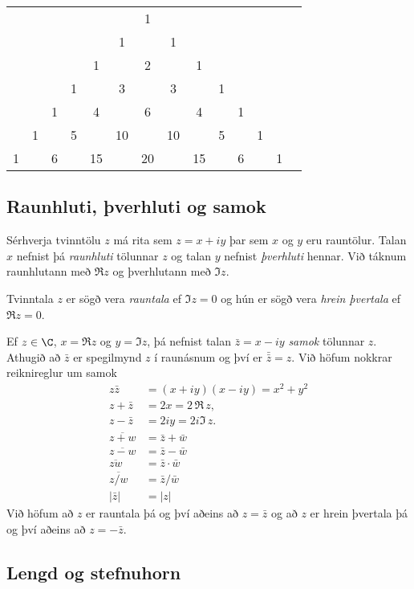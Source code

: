 \begin{center}
\begin{tabular}{cccccccccccccc}
& & & & & & 1 & & & & & & & \\
& & & & & 1 & & 1 \\
& & & & 1 & & 2 & & 1 \\
& & & 1 & & 3 & & 3 & & 1 \\
& & 1 & & 4 & & 6 & & 4 & & 1 \\
& 1 & & 5 & & 10 & & 10 & & 5 & & 1\\
1 & & 6 & & 15 & & 20 & & 15 & & 6 & & 1
\end{tabular}
\end{center}




\subsection*{Raunhluti, þverhluti og samok}

Sérhverja tvinntölu $z$ má rita sem $z=x+iy$ þar sem $x$ og
$y$ eru rauntölur. Talan $x$ nefnist þá {\it raunhluti} tölunnar 
$z$ og talan $y$ nefnist {\it þverhluti } hennar.       Við táknum
raunhlutann með $\Re z$ og þverhlutann með $\Im z$.

Tvinntala $z$ er sögð vera {\it rauntala} 
ef $\Im z=0$ og hún er sögð vera {\it hrein
þvertala} ef $\Re z=0$.  

Ef $z\in \C$, $x=\Re z$ og $y=\Im z$, þá nefnist talan
$\bar z=x-iy$
{\it samok} tölunnar $z$.  
Athugið að $\bar z$ er spegilmynd $z$ í raunásnum og því er
$\bar{\bar z}=z$.  
Við höfum nokkrar reiknireglur
um samok
\begin{align*}
z\bar z&=(x+iy)(x-iy)=x^2+y^2  \\
z+\bar z&=2x=2\, \Re \, z, \\
z-\bar z&=2iy=2i\Im \, z.\\  
\overline{z+w} &= \bar z+ \bar w \\
\overline{z-w} &= \bar z- \bar w \\
\overline{zw} &= \bar z\cdot \bar w \\
\overline{z/w} &= \bar z/ \bar w \\
 |\bar z|&=|z| 
\end{align*}
Við höfum að $z$ er rauntala þá og því aðeins að $z=\bar z$ og að $z$
er hrein þvertala þá og því aðeins að $z=-\bar z$.

\subsection*{Lengd og stefnuhorn}


